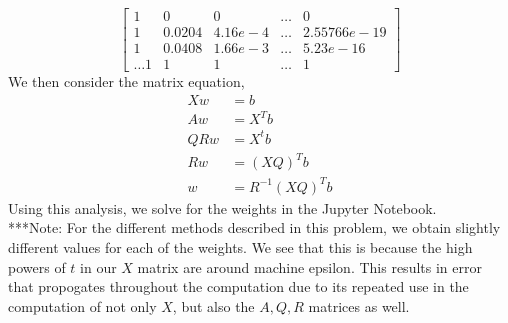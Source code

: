 \documentclass[letterpaper,10pt]{article}
\begin{document}
\begin{description}
\[\begin{bmatrix}
1 & 0 & 0 & \ldots & 0\\
1 & 0.0204 & 4.16e-4 & \ldots & 2.55766e-19\\
1 & 0.0408 & 1.66e-3 & \ldots & 5.23e-16\\
\ldots
1 & 1 & 1 & \ldots & 1
\end{bmatrix} \]
We then consider the matrix equation,
\begin{align*}
Xw &=b\\
Aw &=X^Tb\\
QRw &= X^tb\\
Rw &= (XQ)^Tb\\
w &= R^{-1}(XQ)^Tb
\end{align*}
Using this analysis, we solve for the weights in the Jupyter Notebook.\\
***Note: For the different methods described in this problem, we obtain slightly different values for each of the weights. We see that this is because the high powers of $t$ in our $X$ matrix are around machine epsilon. This results in error that propogates throughout the computation due to its repeated use in the computation of not only $X$, but also the $A,Q,R$ matrices as well.
\end{description}
\end{document}
